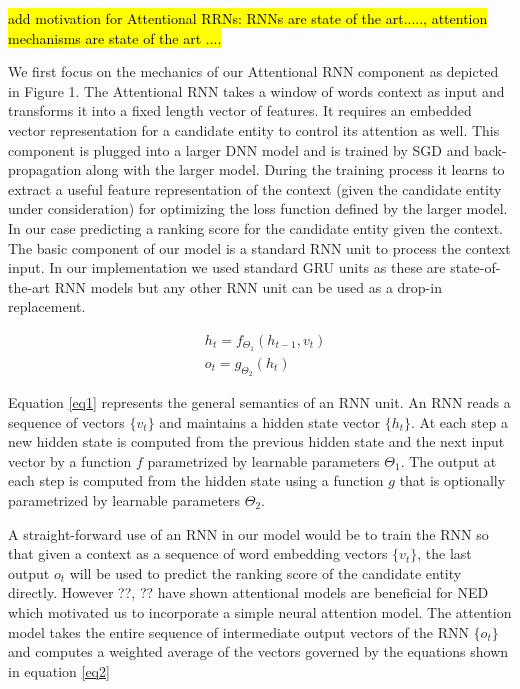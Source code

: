 \documentclass[11pt]{article}
\begin{document}
\hl{add motivation for Attentional RRNs: RNNs are state of the art....., attention mechanisms are state of the art ....}

We first focus on the mechanics of our Attentional RNN component as depicted in Figure 1. The Attentional RNN takes a window of words context as input and transforms it into a fixed length vector of features. It requires an embedded vector representation for a candidate entity to control its attention as well. This component is plugged into a larger DNN model and is trained by SGD and back-propagation along with the larger model. During the training process it learns to extract a useful feature representation of the context (given the candidate entity under consideration) for optimizing the loss function defined by the larger model. In our case predicting a ranking score for the candidate entity given the context.
The basic component of our model is a standard RNN unit to process the context input. In our implementation we used standard GRU units \cite{cho2014learning} as these are state-of-the-art RNN models but any other RNN unit can be used as a drop-in replacement. 

\begin{equation}
	\label{eq1}
	\begin{aligned}
		& h_t=f_{\Theta_1}(h_{t-1}, v_t) \\
		& o_t=g_{\Theta_2}(h_t)
	\end{aligned}
\end{equation}

Equation \ref{eq1} represents the general semantics of an RNN unit. An RNN reads a sequence of vectors $\{v_t\}$ and maintains a hidden state vector $\{h_t\}$. At each step a new hidden state is computed from the previous hidden state and the next input vector by a function $f$ parametrized by learnable parameters $\Theta_1$. The output at each step is computed from the hidden state using a function $g$ that is optionally parametrized by learnable parameters $\Theta_2$. 

A straight-forward use of an RNN in our model would be to train the RNN so that given a context as a sequence of word embedding vectors $\{v_t\}$, the last output $o_t$ will be used to predict the ranking score of the candidate entity directly. However ??, ?? have shown attentional models are beneficial for NED which motivated us to incorporate a simple neural attention model. The attention model takes the entire sequence of intermediate output vectors of the RNN $\{o_t\}$ and computes a weighted average of the vectors governed by the equations shown in equation \ref{eq2}
\end{document}
